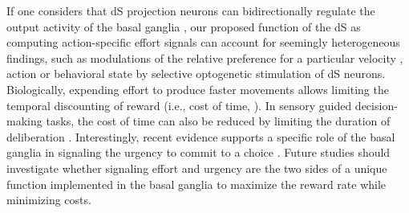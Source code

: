 If one considers that dS projection neurons can bidirectionally regulate the output activity of the basal ganglia \cite{Kravitz2010}, our proposed function of the dS as computing action-specific effort signals can account for seemingly heterogeneous findings, such as modulations of the relative preference for a particular velocity \cite{ Yttri2016}, action \cite{Tai2012NN, Kravitz2012NN} or behavioral state \cite{Kravitz2010} by selective optogenetic stimulation of dS neurons.
Biologically, expending effort to produce faster movements allows limiting the temporal discounting of reward (i.e., cost of time, \cite{Shadmehr2019TINS}).
In sensory guided decision-making tasks, the cost of time can also be reduced by limiting the duration of deliberation \cite{Carland2019}. 
Interestingly, recent evidence supports a specific role of the basal ganglia in signaling the urgency to commit to a choice \cite{Thura2017Neuron,Carland2019}. 
Future studies should investigate whether signaling effort and urgency are the two sides of a unique function implemented in the basal ganglia to maximize the reward rate while minimizing costs.
